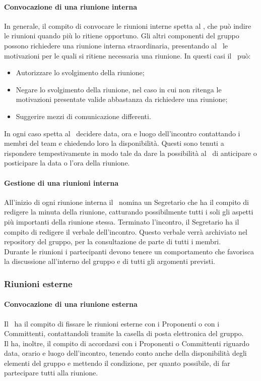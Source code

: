 \documentclass[../NormeProgetto.tex]{subfiles}
\begin{document}
		\paragraph{Convocazione di una riunione interna}
		In generale, il compito di convocare le riunioni interne spetta al \responsabilediprogetto, che può indire le riunioni quando più lo ritiene opportuno. Gli altri componenti del gruppo possono richiedere una riunione interna straordinaria, presentando al \responsabilediprogetto\ le motivazioni per le quali si ritiene necessaria una riunione. In questi casi il \responsabilediprogetto\ può:
		\begin{itemize}
		\item Autorizzare lo svolgimento della riunione;
		\item Negare lo svolgimento della riunione, nel caso in cui non ritenga le motivazioni presentate valide abbastanza da richiedere una riunione;
		\item Suggerire mezzi di comunicazione differenti.
		\end{itemize}
		In ogni caso spetta al \responsabilediprogetto\ decidere data, ora e luogo dell'incontro contattando i membri del team e chiedendo loro la disponibilità. Questi sono tenuti a rispondere tempestivamente in modo tale da dare la possibilità al \responsabilediprogetto\ di anticipare o posticipare la data o l'ora della riunione.
		\paragraph{Gestione di una riunioni interna}
		All'inizio di ogni riunione interna il \responsabilediprogetto\ nomina un Segretario che ha il compito di redigere la minuta della riunione, catturando possibilmente tutti i soli gli aspetti più importanti della riunione stessa. Terminato l'incontro, il Segretario ha il compito di redigere il verbale dell'incontro. Questo verbale verrà archiviato nel repository del gruppo, per la consultazione de parte di tutti i membri. \\ Durante le riunioni i partecipanti devono tenere un comportamento che favorisca la discussione all'interno del gruppo e di tutti gli argomenti previsti. 
		\subsubsection{Riunioni esterne}
		\paragraph{Convocazione di una riunione esterna}
		Il \responsabilediprogetto\ ha il compito di fissare le riunioni esterne con i Proponenti o con i Committenti, contattandoli tramite la casella di posta elettronica del gruppo.\\ Il \responsabilediprogetto ha, inoltre, il compito di accordarsi con i Proponenti o Committenti riguardo data, orario e luogo dell'incontro, tenendo conto anche della disponibilità degli elementi del gruppo e mettendo il condizione, per quanto possibile, di far partecipare tutti alla riunione.
\end{document}
